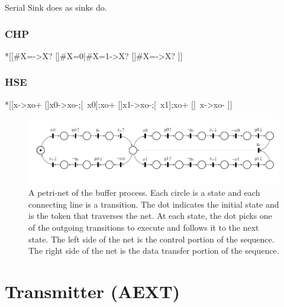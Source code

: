 \documentclass{article}
\begin{document}
Serial Sink does as sinks do.

\subsubsection*{CHP}

\begin{csp}
*[[#{X=\phi}->X?
  []#{X=0}|#{X=1}->X?
  []#{X=\neg\phi}->X?
 ]]
\end{csp}

\subsubsection*{HSE}

\begin{hse}
*[[x\phi->xo+
  []x0->xo-;[~x0];xo+
  []x1->xo-;[~x1];xo+
  []~x\phi->xo-
 ]]
\end{hse}

\begin{figure}
    \centering
    \includegraphics[width=.95\textwidth]{img/serial_protocol_petri_net.pdf}
    \caption{A petri-net of the buffer process.
Each circle is a state and each connecting line is a transition. The dot
indicates the initial state and is the token that traverses the net.
At each state, the dot picks one of the outgoing transitions to execute
and follows it to the next state. The left side of the net is the control
portion of the sequence. The right side of the net is the data transfer
portion of the sequence.}
    \label{fig:protocol_net}
\end{figure}

\section{Transmitter (AEXT)}
\end{document}
